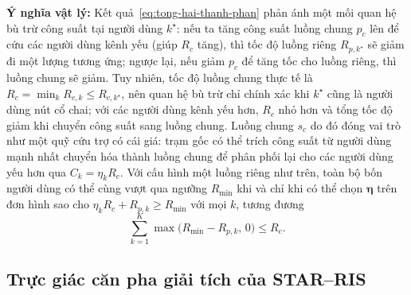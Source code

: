 \textbf{Ý nghĩa vật lý:} Kết quả~\eqref{eq:tong-hai-thanh-phan} phản ánh một mối quan hệ bù trừ công suất tại
người dùng $k^\star$: nếu ta tăng công suất luồng chung $p_c$ lên để cứu các người dùng kênh yếu (giúp $R_c$
tăng), thì tốc độ luồng riêng $R_{p,k^\star}$ sẽ giảm đi một lượng tương ứng; ngược lại, nếu giảm $p_c$ để tăng
tốc cho luồng riêng, thì luồng chung sẽ giảm. Tuy nhiên, tốc độ luồng chung thực tế là
$R_c = \min_k R_{c,k} \le R_{c,k^\star}$, nên quan hệ bù trừ chỉ chính xác khi $k^\star$ cũng là người dùng nút
cổ chai; với các người dùng kênh yếu hơn, $R_c$ nhỏ hơn và tổng tốc độ giảm khi chuyển công suất sang luồng
chung. Luồng chung $s_c$ do đó đóng vai trò như một quỹ cứu trợ có cái giá: trạm gốc có thể trích công suất từ
người dùng mạnh nhất chuyển hóa thành luồng chung để phân phối lại cho các người dùng yếu hơn qua
$C_k = \eta_k R_c$. Với cấu hình một luồng riêng như trên, toàn bộ bốn người dùng có thể cùng vượt qua ngưỡng
$R_{\min}$ khi và chỉ khi có thể chọn $\boldsymbol{\eta}$ trên đơn hình sao cho $\eta_k R_c + R_{p,k} \ge
R_{\min}$ với mọi $k$, tương đương
\begin{equation}
\sum_{k=1}^{K} \max\big(R_{\min} - R_{p,k},\, 0\big) \le R_c .
\label{eq:dieu-kien-qos}
\end{equation}

\subsection{Trực giác căn pha giải tích của STAR--RIS}
\label{ssec:vai-tro-can-pha}

